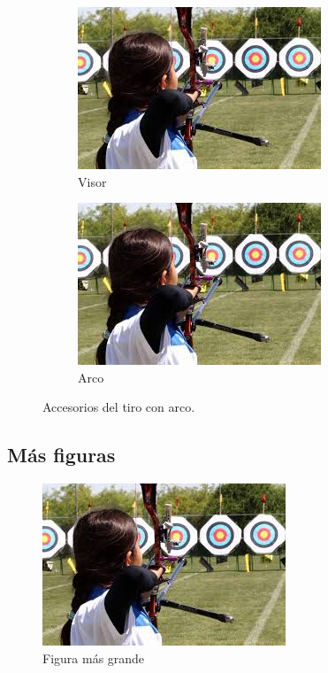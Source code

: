 \documentclass[12pt, legalpaper, twocolumn]{article}
\begin{document}
\begin{figure}[H]
    \begin{subfigure}{0.45\textwidth} %
        \centering
        \includegraphics[scale=1]{tiro_arco.jpg} 
        \caption{Visor}
        \label{c}
    \end{subfigure}
    \begin{subfigure}{0.45\textwidth}
        \centering
        \includegraphics[scale=1]{tiro_arco.jpg} 
        \caption{Arco}
        \label{c}
    \end{subfigure}
    \caption{Accesorios del tiro con arco.}
\end{figure}

\subsection{Más figuras}

\newpage

\begin{landscape}
    \begin{figure}[H]
        \centering
        \includegraphics[scale=1]{tiro_arco.jpg} 
        \caption{Figura más grande}
        \label{fig:enter-label}
    \end{figure}
\end{landscape}
\end{document}
